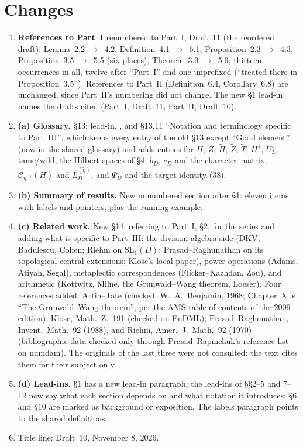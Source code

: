 \documentclass[11pt]{article}
\newcommand{\tH}{\widetilde H}\newcommand{\tZ}{\widetilde Z}
\begin{document}
\section*{Changes}
\begin{enumerate}[leftmargin=*]
\item \textbf{References to Part~I} renumbered to Part~I, Draft~11
(the reordered draft): Lemma~2.2 $\to$~4.2, Definition~4.1 $\to$~6.1,
Proposition~2.3 $\to$~4.3, Proposition~3.5 $\to$~5.5 (six places),
Theorem~3.9 $\to$~5.9; thirteen occurrences in all, twelve after
``Part~I'' and one unprefixed (``treated there in Proposition~3.5'').
References to Part~II (Definition~6.4, Corollary~6.8) are unchanged,
since Part~II's numbering did not change.  The new \S1 lead-in names
the drafts cited (Part~I, Draft~11; Part~II, Draft~10).
\item \textbf{(a) Glossary.}  \S13: lead-in, \verb||,
and \S13.11 ``Notation and terminology specific to Part~III'', which
keeps every entry of the old \S13 except ``Good element'' (now in the
shared glossary) and adds entries for $H$, $Z$, $\tH$, $\tZ$,
$\widetilde T$, $H^1$, $U_D^1$, tame/wild, the Hilbert spaces of
\S4, $b_D$, $c_D$ and the character matrix, $\mathcal C_{\eta^{-1}}(H)$
and $L_D^{(\widetilde\eta)}$, and $\Psi_D$ and the target identity
(38).
\item \textbf{(b) Summary of results.}  New unnumbered section after
\S1: eleven items with labels and pointers, plus the running example.
\item \textbf{(c) Related work.}  New \S14, referring to Part~I, \S2,
for the series and adding what is specific to Part~III: the
division-algebra side (DKV, Badulescu, Cohen; Riehm on
$\mathrm{SL}_1(D)$; Prasad--Raghunathan on its topological central
extensions; Klose's local paper), power operations (Adams, Atiyah,
Segal), metaplectic correspondences (Flicker--Kazhdan, Zou), and
arithmetic (Kottwitz, Milne, the Grunwald--Wang theorem, Loeser).
Four references added: Artin--Tate (checked: W.~A.~Benjamin, 1968;
Chapter~X is ``The Grunwald--Wang theorem'', per the AMS table of
contents of the 2009 edition); Klose, Math.\ Z.\ 191 (checked on
EuDML); Prasad--Raghunathan, Invent.\ Math.\ 92 (1988), and Riehm,
Amer.\ J.\ Math.\ 92 (1970) (bibliographic data checked only through
Prasad--Rapinchuk's reference list on numdam).  The originals of the
last three were not consulted; the text cites them for their subject
only.
\item \textbf{(d) Lead-ins.}  \S1 has a new lead-in paragraph; the
lead-ins of \S\S2--5 and 7--12 now say what each section depends on and
what notation it introduces; \S6 and \S10 are marked as background or
exposition.  The labels paragraph points to the shared definitions.
\item Title line: Draft~10, November 8, 2026.
\end{enumerate}
\end{document}
